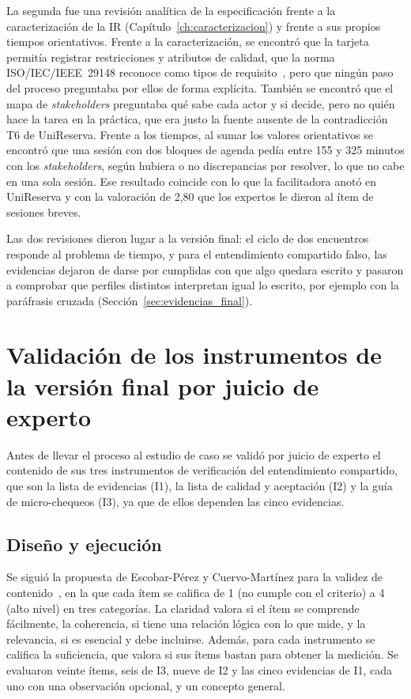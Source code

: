 \documentclass[12pt,letterpaper,oneside]{report}
\begin{document}
La segunda fue una revisión analítica de la especificación frente a la
caracterización de la IR (Capítulo~\ref{ch:caracterizacion}) y frente a sus
propios tiempos orientativos. Frente a la caracterización, se encontró que la
tarjeta permitía registrar restricciones y atributos de calidad, que la norma
ISO/IEC/IEEE~29148 reconoce como tipos de requisito~\cite{iso29148}, pero que ningún paso del proceso preguntaba por ellos de forma explícita.
También se encontró que el mapa de \textit{stakeholders} preguntaba qué sabe cada actor y si decide, pero no
quién hace la tarea en la práctica, que era justo la fuente ausente de la
contradicción T6 de UniReserva. Frente a los tiempos, al sumar los valores
orientativos se encontró que una sesión con dos bloques de agenda pedía entre
155 y 325 minutos con los \textit{stakeholders}, según hubiera o no
discrepancias por resolver, lo que no cabe en una sola sesión. Ese resultado
coincide con lo que la facilitadora anotó en UniReserva y con la valoración de 2,80 que los
expertos le dieron al ítem de sesiones breves.

Las dos revisiones dieron lugar a la versión final: el ciclo de dos encuentros
responde al problema de tiempo, y para el entendimiento compartido falso, las
evidencias dejaron de darse por cumplidas con que algo quedara escrito y pasaron
a comprobar que perfiles distintos interpretan igual lo escrito, por ejemplo con
la paráfrasis cruzada (Sección~\ref{sec:evidencias_final}).


\section{Validación de los instrumentos de la versión final por juicio de experto}
\label{sec:val_experto_final}
Antes de llevar el proceso al estudio de caso se validó por juicio de experto
el contenido de sus tres instrumentos de verificación del entendimiento
compartido, que son la lista de evidencias (I1), la lista de calidad y
aceptación (I2) y la guía de micro-chequeos (I3), ya que de ellos dependen las
cinco evidencias.

\subsection{Diseño y ejecución}
Se siguió la propuesta de Escobar-Pérez y Cuervo-Martínez para la validez de
contenido~\cite{escobar2008validez}, en la que cada ítem se califica de 1
(no cumple con el criterio) a 4 (alto nivel) en tres categorías. La claridad valora si el ítem se comprende
fácilmente, la coherencia, si tiene una relación lógica con lo que mide, y la
relevancia, si es esencial y debe incluirse. Además, para cada instrumento se califica la
suficiencia, que valora si sus ítems bastan para obtener la medición. Se
evaluaron veinte ítems, seis de I3, nueve de I2 y las cinco evidencias de I1,
cada uno con una observación opcional, y un concepto general.
\end{document}
